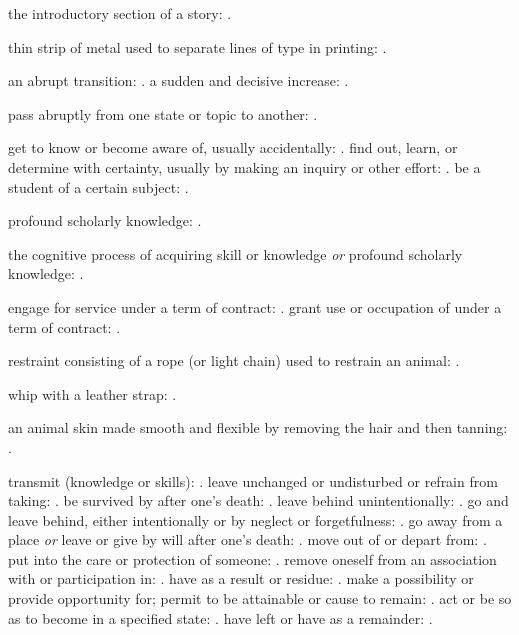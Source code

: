   the introductory section of a story: .

  thin strip of metal used to separate lines of type in printing: .

  an abrupt transition: . a sudden and decisive increase: .

  pass abruptly from one state or topic to another: .

  get to know or become aware of, usually accidentally: . find out, learn, or determine with certainty, usually by making an inquiry or other effort: . be a student of a certain subject: .

  profound scholarly knowledge: .

  the cognitive process of acquiring skill or knowledge \textit{or} profound scholarly knowledge: .

  engage for service under a term of contract: . grant use or occupation of under a term of contract: .

  restraint consisting of a rope (or light chain) used to restrain an animal: .

  whip with a leather strap: .

  an animal skin made smooth and flexible by removing the hair and then tanning: .

  transmit (knowledge or skills): . leave unchanged or undisturbed or refrain from taking: . be survived by after one's death: . leave behind unintentionally: . go and leave behind, either intentionally or by neglect or forgetfulness: . go away from a place \textit{or} leave or give by will after one's death: . move out of or depart from: . put into the care or protection of someone: . remove oneself from an association with or participation in: . have as a result or residue: . make a possibility or provide opportunity for; permit to be attainable or cause to remain: . act or be so as to become in a specified state: . have left or have as a remainder: .

